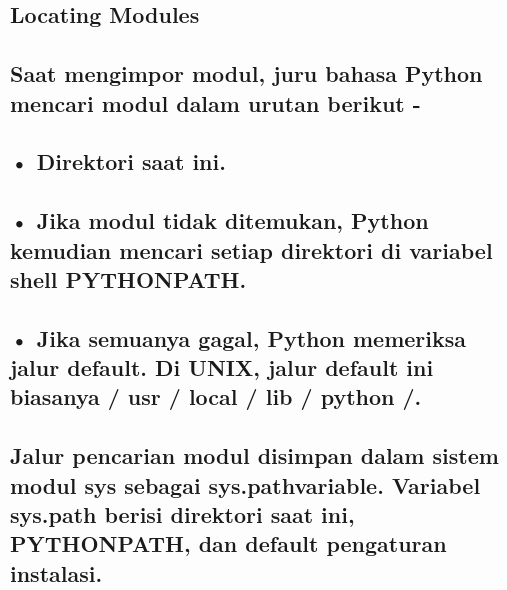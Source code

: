 \documentclass[a4paper,12pt]{report}
\begin{document}
\subsection*{Locating Modules}
 \par
\subsection*{Saat mengimpor modul, juru bahasa Python mencari modul dalam urutan berikut -}
 \par
\subsection*{ \hspace{10pt} • Direktori saat ini.}
 \par
\subsection*{ \hspace{10pt} • Jika modul tidak ditemukan, Python kemudian mencari setiap direktori di variabel shell  \hspace{10pt} PYTHONPATH.}
 \par
\subsection*{ \hspace{10pt} • Jika semuanya gagal, Python memeriksa jalur default. Di UNIX, jalur default ini  \hspace{10pt} biasanya / usr / local / lib / python /.}
 \par
\vspace{12pt}
\subsection*{Jalur pencarian modul disimpan dalam sistem modul sys sebagai sys.pathvariable. Variabel sys.path berisi direktori saat ini, PYTHONPATH, dan default pengaturan instalasi.}
 \par
\vspace{12pt}
\end{document}
